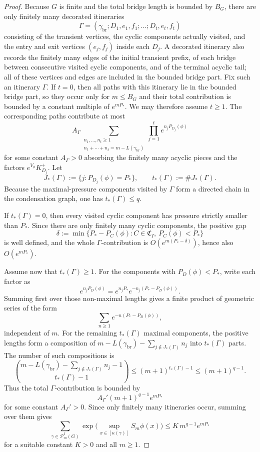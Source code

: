 \documentclass{etds}%
\numberwithin{equation}{section}
\theoremstyle{plain}
\theoremstyle{definition}
\theoremstyle{remark}
\begin{document}
\begin{proof}
Because $G$ is finite and the total bridge length is bounded by $B_G$, there
are only finitely many decorated itineraries
\[
\Gamma=(\gamma_{\mathrm{br}};D_1,e_1,f_1;\dots;D_t,e_t,f_t)
\]
consisting of the transient vertices, the cyclic components actually visited,
and the entry and exit vertices $(e_j,f_j)$ inside each $D_j$.  A decorated
itinerary also records the finitely many edges of the initial transient
prefix, of each bridge between consecutive visited cyclic components, and of
the terminal acyclic tail; all of these vertices and edges are included in
the bounded bridge part.  Fix such an itinerary $\Gamma$.  If $t=0$, then all
paths with this itinerary lie in the bounded bridge part, so they occur only
for $m\le B_G$ and their total contribution is bounded by a constant multiple
of $e^{mP_*}$.  We may therefore assume $t\ge 1$.  The corresponding paths
contribute at most
\[
A_\Gamma
\sum_{\substack{n_1,\dots,n_t\ge 1\\
n_1+\cdots+n_t=m-L(\gamma_{\mathrm{br}})}}
\prod_{j=1}^t e^{n_jP_{D_j}(\phi)}
\]
for some constant $A_\Gamma>0$ absorbing the finitely many acyclic pieces and
the factors $e^{V_\phi}K_{D_j}^+$.  Let
\[
J_*(\Gamma):=\{j:P_{D_j}(\phi)=P_*\},
\qquad
t_*(\Gamma):=\#J_*(\Gamma).
\]
Because the maximal-pressure components visited by $\Gamma$ form a directed
chain in the condensation graph, one has $t_*(\Gamma)\le q$.

If $t_*(\Gamma)=0$, then every visited cyclic component has pressure strictly
smaller than $P_*$.  Since there are only finitely many cyclic components, the
positive gap
\[
\delta:=\min\{P_*-P_C(\phi):C\in\mathfrak{C}_I,\ P_C(\phi)<P_*\}
\]
is well defined, and the whole $\Gamma$-contribution is
$O(e^{m(P_*-\delta)})$, hence also $O(e^{mP_*})$.

Assume now that $t_*(\Gamma)\ge 1$.  For the components with
$P_D(\phi)<P_*$, write each factor as
\[
e^{n_jP_D(\phi)}=e^{n_jP_*}e^{-n_j(P_*-P_D(\phi))}.
\]
Summing first over those non-maximal lengths gives a finite product of
geometric series of the form
\[
\sum_{n\ge 1}e^{-n(P_*-P_D(\phi))},
\]
independent of $m$.  For the remaining $t_*(\Gamma)$ maximal components, the
positive lengths form a composition of
$m-L(\gamma_{\mathrm{br}})-\sum_{j\notin J_*(\Gamma)}n_j$ into
$t_*(\Gamma)$ parts.  The number of such compositions is
\[
\binom{m-L(\gamma_{\mathrm{br}})-\sum_{j\notin J_*(\Gamma)}n_j-1}
{t_*(\Gamma)-1}
\le (m+1)^{t_*(\Gamma)-1}
\le (m+1)^{q-1}.
\]
Thus the total $\Gamma$-contribution is bounded by
\[
A_\Gamma'(m+1)^{q-1}e^{mP_*}
\]
for some constant $A_\Gamma'>0$.  Since only finitely many itineraries occur,
summing over them gives
\[
\sum_{\gamma\in\mathcal{P}_m^I(G)}
\exp\!\bigl(\sup_{x\in[\kappa(\gamma)]}S_m\phi(x)\bigr)
\le K\,m^{q-1}e^{mP_*}
\]
for a suitable constant $K>0$ and all $m\ge 1$.
\end{proof}
\end{document}
